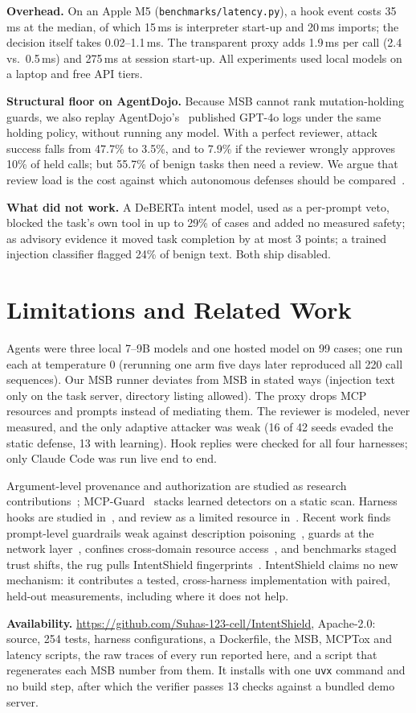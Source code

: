 \documentclass[10pt,conference]{IEEEtran}
\newcommand{\tool}{IntentShield\xspace}
\newcommand{\repo}{\url{https://github.com/Suhas-123-cell/IntentShield}}
\begin{document}
\textbf{Overhead.} On an Apple M5 (\texttt{benchmarks/latency.py}), a hook event costs 35\,ms at the
median, of which 15\,ms is interpreter start-up and 20\,ms imports; the decision itself takes
0.02--1.1\,ms. The transparent proxy adds 1.9\,ms per call (2.4 vs.\ 0.5\,ms) and 275\,ms at
session start-up. All experiments used local models on a laptop and free API tiers.

\textbf{Structural floor on AgentDojo.} Because MSB cannot rank mutation-holding guards, we also
replay AgentDojo's~\cite{agentdojo} published GPT-4o logs under the same holding policy, without
running any model. With a perfect reviewer, attack success falls from 47.7\% to 3.5\%, and to 7.9\% if
the reviewer wrongly approves 10\% of held calls; but 55.7\% of benign tasks then need a review. We
argue that review load is the cost against which autonomous defenses should be compared~\cite{oversight}.

\textbf{What did not work.} A DeBERTa intent model, used as a per-prompt veto, blocked the task's own tool in up to 29\%
of cases and added no measured safety; as advisory evidence it moved task completion by at most 3 points; a trained injection classifier flagged 24\% of benign text. Both ship disabled.

\section{Limitations and Related Work}
Agents were three local 7--9B models and one hosted model on 99 cases; one run each at temperature 0 (rerunning one arm five days later reproduced all 220 call sequences). Our MSB runner deviates from MSB in
stated ways (injection text only on the task server, directory listing allowed). The proxy drops MCP
resources and prompts instead of mediating them. The reviewer is modeled, never measured, and the only
adaptive attacker was weak (16 of 42 seeds evaded the static defense, 13 with learning). Hook replies were checked for all four harnesses; only Claude Code was run
live end to end.

Argument-level provenance and authorization are studied as research
contributions~\cite{pact,toolfence,camel}; MCP-Guard~\cite{mcpguard} stacks learned detectors on a
static scan. Harness hooks are studied in~\cite{capscope,harnessbench,laundering}, and review as a
limited resource in~\cite{oversight,stack}. Recent work finds prompt-level guardrails weak against
description poisoning~\cite{mcptdp}, guards at the network layer~\cite{shieldnet}, confines
cross-domain resource access~\cite{aegis}, and benchmarks staged trust shifts, the rug pulls \tool
fingerprints~\cite{trustshift}. \tool claims no new mechanism: it contributes a tested,
cross-harness implementation with paired, held-out measurements, including where it does not help.

\textbf{Availability.} \repo, Apache-2.0: source, 254 tests, harness configurations, a Dockerfile,
the MSB, MCPTox and latency scripts, the raw traces of every run reported here, and a script that
regenerates each MSB number from them. It installs with one
\texttt{uvx} command and no build step, after which the verifier passes 13 checks against a bundled
demo server.



\end{document}
